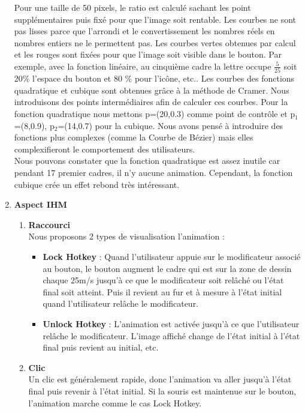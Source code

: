 \documentclass[12pt,a4paper]{article}
\begin{document}
\begin{enumerate}
\begin{center}
\end{center}
Pour une taille de 50 pixels, le ratio est calculé sachant les point supplémentaires puis fixé pour que l'image soit rentable.
Les courbes ne sont pas lisses parce que l'arrondi et le convertissement les nombres réels en nombres entiers ne le permettent pas. Les courbes vertes obtenues par calcul et les rouges sont fixées pour que l'image soit visible dans le bouton. Par exemple, avec la fonction linéaire, au cinquième cadre la lettre occupe $\frac{5}{25}$ soit 20\% l'espace du bouton et 80 \% pour l'icône, etc.. Les courbes des fonctions quadratique et cubique sont obtenues grâce à la méthode de Cramer. Nous introduisons des points intermédiaires afin de calculer ces courbes. Pour la fonction quadratique nous mettons p=(20,0.3) comme point de contrôle et p$_1$=(8,0.9), p$_2$=(14,0.7) pour la cubique.
Nous avons pensé à introduire des fonctions plus complexes (comme la Courbe de Bézier) mais elles complexifieront le comportement des utilisateurs.\\
Nous pouvons constater que la fonction quadratique est assez inutile car pendant 17 premier cadres, il n'y aucune animation. Cependant, la fonction cubique crée un effet rebond très intéressant.
\item {\large \textbf{Aspect IHM}}\\
\begin{enumerate}
\item {\large \textbf{Raccourci}}\\
Nous proposons 2 types de visualisation l'animation :
\begin{itemize}
\item \textbf{Lock Hotkey} : Quand l'utilisateur appuie sur le modificateur associé au bouton, le bouton augment le cadre qui est sur la zone de dessin chaque 25m/s jusqu'à ce que le modificateur soit relâché ou l'état final soit atteint. Puis il revient au fur et à mesure à l'état initial quand l'utilisateur relâche le modificateur.
\item \textbf{Unlock Hotkey} : L'animation est activée jusqu'à ce que l'utilisateur relâche le modificateur. L'image affiché change de l'état initial à l'état final puis revient au initial, etc.
\end{itemize}
\item {\large \textbf{Clic}}\\
Un clic est généralement rapide, donc l'animation va aller jusqu'à l'état final puis revenir à l'état initial. Si la souris est maintenue sur le bouton, l'animation marche comme le cas Lock Hotkey.

\end{enumerate}
\end{enumerate}
\end{document}
